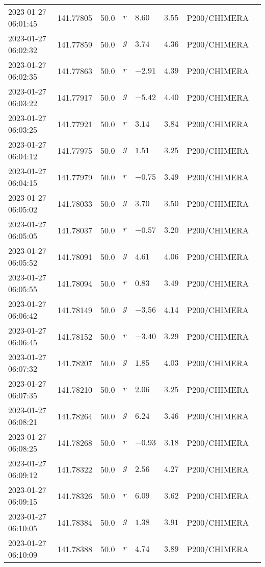 \documentclass{nature_plusfigure}
\begin{document}
\begin{supplement}
\begin{center}
\begin{longtable}{llllllll}
2023-01-27 06:01:45 & 141.77805 & 50.0 & $r$ & $8.60$ & $3.55$ & P200/CHIMERA &  \\ 
2023-01-27 06:02:32 & 141.77859 & 50.0 & $g$ & $3.74$ & $4.36$ & P200/CHIMERA &  \\ 
2023-01-27 06:02:35 & 141.77863 & 50.0 & $r$ & $-2.91$ & $4.39$ & P200/CHIMERA &  \\ 
2023-01-27 06:03:22 & 141.77917 & 50.0 & $g$ & $-5.42$ & $4.40$ & P200/CHIMERA &  \\ 
2023-01-27 06:03:25 & 141.77921 & 50.0 & $r$ & $3.14$ & $3.84$ & P200/CHIMERA &  \\ 
2023-01-27 06:04:12 & 141.77975 & 50.0 & $g$ & $1.51$ & $3.25$ & P200/CHIMERA &  \\ 
2023-01-27 06:04:15 & 141.77979 & 50.0 & $r$ & $-0.75$ & $3.49$ & P200/CHIMERA &  \\ 
2023-01-27 06:05:02 & 141.78033 & 50.0 & $g$ & $3.70$ & $3.50$ & P200/CHIMERA &  \\ 
2023-01-27 06:05:05 & 141.78037 & 50.0 & $r$ & $-0.57$ & $3.20$ & P200/CHIMERA &  \\ 
2023-01-27 06:05:52 & 141.78091 & 50.0 & $g$ & $4.61$ & $4.06$ & P200/CHIMERA &  \\ 
2023-01-27 06:05:55 & 141.78094 & 50.0 & $r$ & $0.83$ & $3.49$ & P200/CHIMERA &  \\ 
2023-01-27 06:06:42 & 141.78149 & 50.0 & $g$ & $-3.56$ & $4.14$ & P200/CHIMERA &  \\ 
2023-01-27 06:06:45 & 141.78152 & 50.0 & $r$ & $-3.40$ & $3.29$ & P200/CHIMERA &  \\ 
2023-01-27 06:07:32 & 141.78207 & 50.0 & $g$ & $1.85$ & $4.03$ & P200/CHIMERA &  \\ 
2023-01-27 06:07:35 & 141.78210 & 50.0 & $r$ & $2.06$ & $3.25$ & P200/CHIMERA &  \\ 
2023-01-27 06:08:21 & 141.78264 & 50.0 & $g$ & $6.24$ & $3.46$ & P200/CHIMERA &  \\ 
2023-01-27 06:08:25 & 141.78268 & 50.0 & $r$ & $-0.93$ & $3.18$ & P200/CHIMERA &  \\ 
2023-01-27 06:09:12 & 141.78322 & 50.0 & $g$ & $2.56$ & $4.27$ & P200/CHIMERA &  \\ 
2023-01-27 06:09:15 & 141.78326 & 50.0 & $r$ & $6.09$ & $3.62$ & P200/CHIMERA &  \\ 
2023-01-27 06:10:05 & 141.78384 & 50.0 & $g$ & $1.38$ & $3.91$ & P200/CHIMERA &  \\ 
2023-01-27 06:10:09 & 141.78388 & 50.0 & $r$ & $4.74$ & $3.89$ & P200/CHIMERA &  \\ 

\end{longtable}
\end{center}
\end{supplement}
\end{document}

